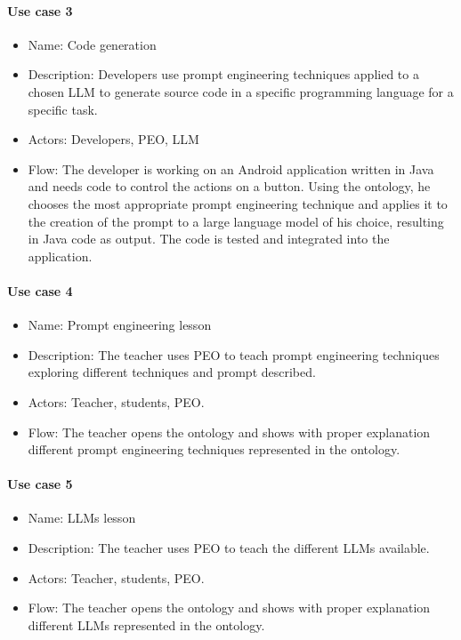 \paragraph{Use case 3}
\begin{itemize}
    \item Name: Code generation
    \item Description: Developers use prompt engineering techniques applied to a chosen LLM to generate source code in a specific programming language for a specific task.
    \item Actors: Developers, PEO, LLM
    \item Flow: The developer is working on an Android application written in Java and needs code to control the actions on a button. Using the ontology, he chooses the most appropriate prompt engineering technique and applies it to the creation of the prompt to a large language model of his choice,  resulting in Java code as output. The code is tested and integrated into the application. 
\end{itemize}

\paragraph{Use case 4}
\begin{itemize}
    \item Name: Prompt engineering lesson
    \item Description: The teacher uses PEO to teach prompt engineering techniques exploring different techniques and prompt described.
    \item Actors: Teacher, students, PEO. 
    \item Flow: The teacher opens the ontology and shows with proper explanation different prompt engineering techniques represented in the ontology.
\end{itemize}

\paragraph{Use case 5}
\begin{itemize}
    \item Name: LLMs lesson
    \item Description: The teacher uses PEO to teach the different LLMs available.
    \item Actors: Teacher, students, PEO.
    \item Flow: The teacher opens the ontology and shows with proper explanation different LLMs represented in the ontology. 
\end{itemize}
